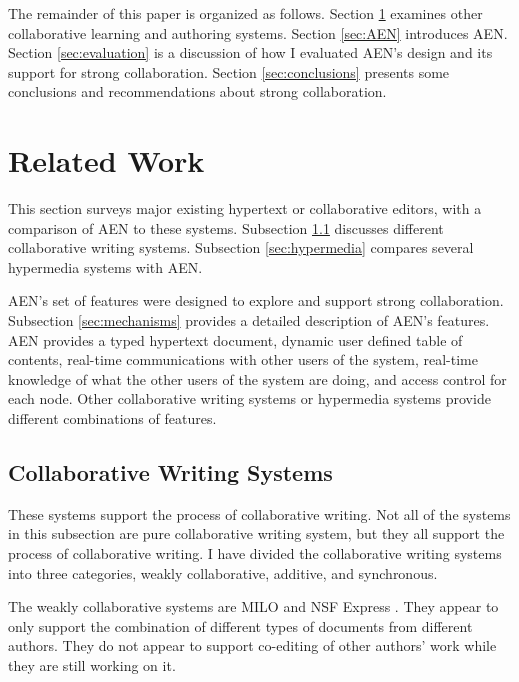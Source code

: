The remainder of this paper is organized as follows.  Section
\ref{sec:related-work} examines other collaborative learning and authoring
systems.  Section \ref{sec:AEN} introduces AEN.  Section
\ref{sec:evaluation} is a discussion of how I evaluated AEN's design and
its support for strong collaboration.  Section \ref{sec:conclusions}
presents some conclusions and recommendations about strong collaboration.


\section{Related Work}
\label{sec:related-work}

This section surveys major existing hypertext or collaborative editors,
with a comparison of AEN to these systems.  Subsection \ref{sec:collab-sys}
discusses different collaborative writing systems.  Subsection
\ref{sec:hypermedia} compares several hypermedia systems with AEN.

AEN's set of features were designed to explore and support strong
collaboration. Subsection \ref{sec:mechanisms} provides a detailed description
of AEN's features.  AEN provides a typed hypertext document, dynamic user
defined table of contents, real-time communications with other users of the
system, real-time knowledge of what the other users of the system are doing,
and access control for each node.  Other collaborative writing systems or
hypermedia systems provide different combinations of features.

\subsection{Collaborative Writing Systems}
\label{sec:collab-sys}

These systems support the process of collaborative writing.  Not all of the
systems in this subsection are pure collaborative writing system, but they all
support the process of collaborative writing.  I have divided the
collaborative writing systems into three categories, weakly collaborative,
additive, and synchronous.

The weakly collaborative systems are MILO \cite{Jones93} and NSF Express
\cite{Greenberg91}.  They appear to only support the combination of
different types of documents from different authors.  They do not appear to
support co-editing of other authors' work while they are still working on
it.

